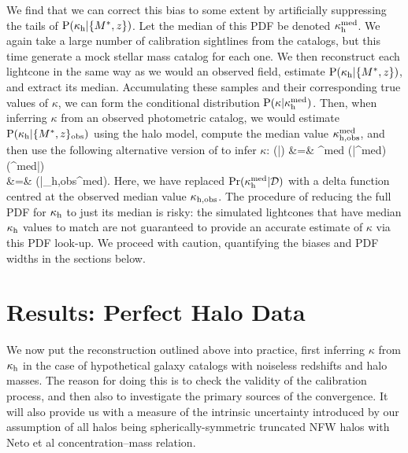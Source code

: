 \documentclass[useAMS,usenatbib]{mn2e}
\begin{document}
We find that we can correct this bias to some extent by artificially 
suppressing the tails of ${\rm P}(\kappa_{\rm h}|\{M^{*},z\})$. Let the median of
this PDF be denoted $\kappa_{\rm h}^{\rm med}$. We again take a large number of
calibration sightlines from the \MS catalogs, but this time generate a mock
stellar mass catalog for each one. We then reconstruct each lightcone in the
same way as we would an observed field,
estimate ${\rm P}(\kappa_{\rm h}|\{M^{*},z\})$, and extract its median. Accumulating
these samples and their corresponding true values of $\kappa$, we can form the 
conditional distribution ${\rm P}(\kappa|\kappa_{\rm h}^{\rm med})$. 
Then, when inferring $\kappa$ from an observed photometric catalog, we would
estimate ${\rm P}(\kappa_{\rm h}|\{M^{*},z\}_{\rm obs})$ 
using the halo model, compute the median value 
$\kappa_{\rm h,obs}^{\rm med}$, and then use the following alternative
version of 
 to infer $\kappa$: 
\bea
\Pr(\kappa|) &=& \int \dee\kappah^{\rm med} 
   \Pr(\kappa|\kappah^{\rm med}) \Pr(\kappah^{\rm med}|) \notag \\
                        &=& \Pr(\kappa|\kappa_{\rm h,obs}^{\rm med}).
\label{eq:calkappaconv}   
\eea
Here, we have replaced $\Pr(\kappa_{\rm h}^{\rm med}|\mathcal{D})$ with a delta
function centred at the observed median value $\kappa_{\rm h,obs}$. 
The procedure of reducing the full PDF for $\kappa_{\rm h}$ to just its median is
risky: the simulated lightcones that have median $\kappa_{\rm h}$ values to match are
not guaranteed to provide an accurate estimate of $\kappa$ via this PDF
look-up. We proceed with caution, quantifying the biases and PDF widths in the
sections below.



\section{Results: Perfect Halo Data}
\label{sec:knownMh+z} 

We now put the reconstruction \proceedure outlined above into practice, first
inferring $\kappa$ from $\kappa_{\rm h}$ in the case of hypothetical galaxy catalogs
with noiseless redshifts and halo masses. The reason for doing this is to
check the validity of the calibration process, and then also to  investigate
the primary sources of the convergence. It will also provide us with a measure
of the intrinsic uncertainty introduced by our assumption of all halos being
spherically-symmetric truncated NFW halos with Neto et al concentration--mass
relation.
\end{document}
